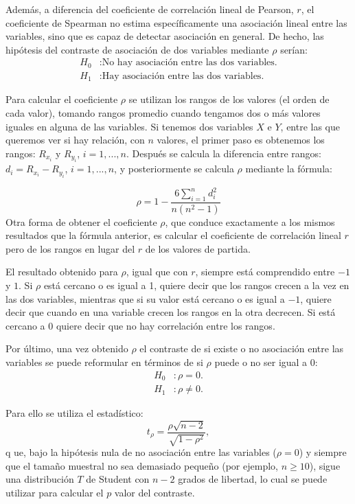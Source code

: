 \begin{description}
Además, a diferencia del coeficiente de correlación lineal de Pearson, $r$, el coeficiente de Spearman no estima específicamente una asociación lineal entre las variables, sino que es capaz de detectar asociación en general. De hecho, las hipótesis del contraste de asociación de dos variables mediante $\rho$ serían:
\begin{align*}
H_0 &: \textrm{No hay asociación entre las dos variables.}\\
H_1 &: \textrm{Hay asociación entre las dos variables.}
\end{align*}

Para calcular el coeficiente $\rho$ se utilizan los rangos de los valores (el orden de cada valor), tomando rangos promedio cuando tengamos dos o más valores iguales en alguna de las variables. Si tenemos dos variables $X$ e $Y$, entre las que queremos ver si hay relación, con $n$ valores, el primer paso es obtenemos los rangos: $R_{x_i}$ y $R_{y_i}$, $i=1,...,n$. Después se calcula la diferencia entre rangos: $d_i=R_{x_i}-R_{y_i}$, $i=1,...,n$, y posteriormente se calcula $\rho$ mediante la fórmula:

\[
\rho  = 1-\frac{6\sum_{i=1}^n d_i^2}{n(n^2-1)}
\]
Otra forma de obtener el coeficiente $\rho$, que conduce exactamente a los mismos resultados que la fórmula anterior, es calcular el coeficiente de correlación lineal $r$ pero de los rangos en lugar del $r$ de los valores de partida.

El resultado obtenido para $\rho$, igual que con $r$, siempre está comprendido entre $-1$ y $1$. Si $\rho$ está cercano o es igual a 1, quiere decir que los rangos crecen a la vez en las dos variables, mientras que si su valor está cercano o es igual a $-1$, quiere decir que cuando en una variable crecen los rangos en la otra decrecen. Si está cercano a 0 quiere decir que no hay correlación entre los rangos.

Por último, una vez obtenido $\rho$ el contraste de si existe o no asociación entre las variables se puede reformular en términos de si $\rho$ puede o no ser igual a 0:
\begin{align*}
H_0 &: \rho=0.\\
H_1 &: \rho\neq 0.
\end{align*}

Para ello se utiliza el estadístico:
\[
t_\rho = \frac{\rho\sqrt{n-2}}{\sqrt{1-\rho^2}},
\]
q
ue, bajo la hipótesis nula de no asociación entre las variables ($\rho=0$) y siempre que el tamaño muestral no sea demasiado pequeño (por ejemplo, $n\geq10$), sigue una distribución $T$ de Student con $n-2$ grados de libertad, lo cual se puede utilizar para calcular el $p$ valor del contraste.


\end{description}

